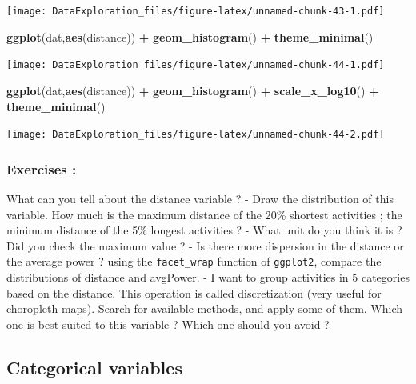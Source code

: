 \documentclass[
]{book}
\newenvironment{Shaded}{\begin{snugshade}}{\end{snugshade}}
\newcommand{\KeywordTok}[1]{\textcolor[rgb]{0.13,0.29,0.53}{\textbf{#1}}}
\newcommand{\NormalTok}[1]{#1}
\newcommand{\OperatorTok}[1]{\textcolor[rgb]{0.81,0.36,0.00}{\textbf{#1}}}
\newcommand{\StringTok}[1]{\textcolor[rgb]{0.31,0.60,0.02}{#1}}
\begin{document}
\texttt{[image: DataExploration\_files/figure-latex/unnamed-chunk-43-1.pdf]}

\begin{Shaded}
\begin{Highlighting}[]
\KeywordTok{ggplot}\NormalTok{(dat,}\KeywordTok{aes}\NormalTok{(distance)) }\OperatorTok{+}\StringTok{ }\KeywordTok{geom_histogram}\NormalTok{() }\OperatorTok{+}\StringTok{ }\KeywordTok{theme_minimal}\NormalTok{()}
\end{Highlighting}
\end{Shaded}

\texttt{[image: DataExploration\_files/figure-latex/unnamed-chunk-44-1.pdf]}

\begin{Shaded}
\begin{Highlighting}[]
\KeywordTok{ggplot}\NormalTok{(dat,}\KeywordTok{aes}\NormalTok{(distance)) }\OperatorTok{+}\StringTok{ }\KeywordTok{geom_histogram}\NormalTok{() }\OperatorTok{+}\StringTok{ }\KeywordTok{scale_x_log10}\NormalTok{() }\OperatorTok{+}\StringTok{ }\KeywordTok{theme_minimal}\NormalTok{()}
\end{Highlighting}
\end{Shaded}

\texttt{[image: DataExploration\_files/figure-latex/unnamed-chunk-44-2.pdf]}

\hypertarget{exercises}{%
\subsubsection{Exercises :}\label{exercises}}

What can you tell about the distance variable ?
- Draw the distribution of this variable. How much is the maximum distance of the 20\% shortest activities ; the minimum distance of the 5\% longest activities ?
- What unit do you think it is ? Did you check the maximum value ?
- Is there more dispersion in the distance or the average power ? using the \texttt{facet\_wrap} function of \texttt{ggplot2}, compare the distributions of distance and avgPower.
- I want to group activities in 5 categories based on the distance. This operation is called discretization (very useful for choropleth maps). Search for available methods, and apply some of them. Which one is best suited to this variable ? Which one should you avoid ?

\hypertarget{categorical-variables}{%
\subsection{Categorical variables}\label{categorical-variables}}
\end{document}
